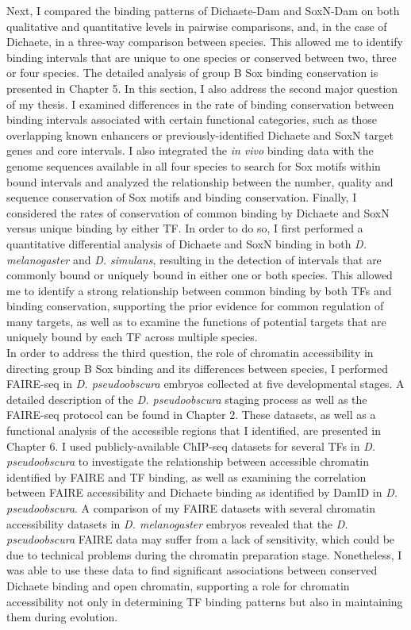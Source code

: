 Next, I compared the binding patterns of Dichaete-Dam and SoxN-Dam on both qualitative and quantitative levels in pairwise comparisons, and, in the case of Dichaete, in a three-way comparison between species. This allowed me to identify binding intervals that are unique to one species or conserved between two, three or four species. The detailed analysis of group B Sox binding conservation is presented in Chapter 5. In this section, I also address the second major question of my thesis. I examined differences in the rate of binding conservation between binding intervals associated with certain functional categories, such as those overlapping known enhancers or previously-identified Dichaete and SoxN target genes and core intervals. I also integrated the \emph{in vivo} binding data with the genome sequences available in all four species to search for Sox motifs within bound intervals and analyzed the relationship between the number, quality and sequence conservation of Sox motifs and binding conservation. Finally, I considered the rates of conservation of common binding by Dichaete and SoxN versus unique binding by either TF. In order to do so, I first performed a quantitative differential analysis of Dichaete and SoxN binding in both \emph{D. melanogaster} and \emph{D. simulans}, resulting in the detection of intervals that are commonly bound or uniquely bound in either one or both species. This allowed me to identify a strong relationship between common binding by both TFs and binding conservation, supporting the prior evidence for common regulation of many targets, as well as to examine the functions of potential targets that are uniquely bound by each TF across multiple species.\\

In order to address the third question, the role of chromatin accessibility in directing group B Sox binding and its differences between species, I performed FAIRE-seq in \emph{D. pseudoobscura} embryos collected at five developmental stages. A detailed description of the \emph{D. pseudoobscura} staging process as well as the FAIRE-seq protocol can be found in Chapter 2. These datasets, as well as a functional analysis of the accessible regions that I identified, are presented in Chapter 6. I used publicly-available ChIP-seq datasets for several TFs in \emph{D. pseudoobscura} to investigate the relationship between accessible chromatin identified by FAIRE and TF binding, as well as examining the correlation between FAIRE accessibility and Dichaete binding as identified by DamID in \emph{D. pseudoobscura}. A comparison of my FAIRE datasets with several chromatin accessibility datasets in \emph{D. melanogaster} embryos revealed that the \emph{D. pseudoobscura} FAIRE data may suffer from a lack of sensitivity, which could be due to technical problems during the chromatin preparation stage. Nonetheless, I was able to use these data to find significant associations between conserved Dichaete binding and open chromatin, supporting a role for chromatin accessibility not only in determining TF binding patterns but also in maintaining them during evolution.\\


